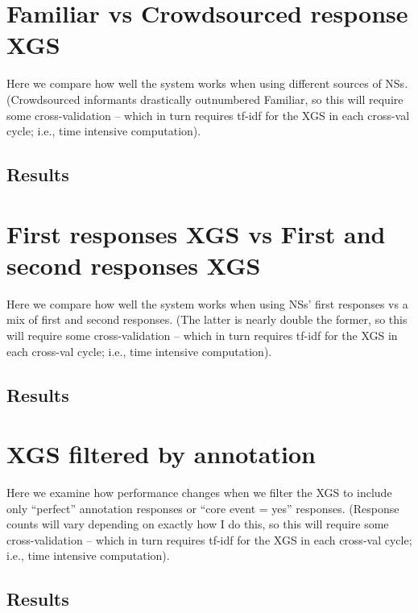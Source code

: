 \section{Familiar vs Crowdsourced response XGS}
\label{section:experiment-crowdsource}
Here we compare how well the system works when using different sources of NSs. (Crowdsourced informants drastically outnumbered Familiar, so this will require some cross-validation -- which in turn requires tf-idf for the XGS in each cross-val cycle; i.e., time intensive computation).
\subsection{Results}
\label{subsection:crowdsource-results}

\section{First responses XGS vs First and second responses XGS}
\label{section:experiment-first-responses}
Here we compare how well the system works when using NSs' first responses vs a mix of first and second responses. (The latter is nearly double the former, so this will require some cross-validation -- which in turn requires tf-idf for the XGS in each cross-val cycle; i.e., time intensive computation).
\subsection{Results}
\label{subsection:first-responses-results}

\section{XGS filtered by annotation}
\label{section:experiment-filtered}
Here we examine how performance changes when we filter the XGS to include only ``perfect'' annotation responses or ``core event = yes'' responses. (Response counts will vary depending on exactly how I do this, so this will require some cross-validation -- which in turn requires tf-idf for the XGS in each cross-val cycle; i.e., time intensive computation).
\subsection{Results}
\label{subsection:filtered-results}
